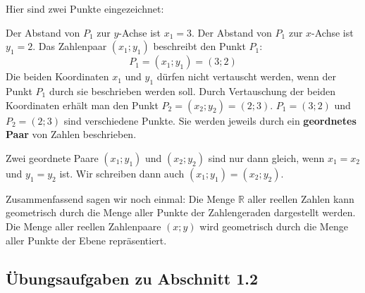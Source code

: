 Hier sind zwei Punkte eingezeichnet:

\begin{center}
\end{center}

Der Abstand von $P_1$ zur $y$-Achse ist $x_1 = 3$. Der Abstand von $P_1$ zur $x$-Achse ist $y_1 = 2$. Das Zahlenpaar $(x_1;y_1)$ beschreibt den Punkt $P_1$:
\[ P_1 = (x_1;y_1) = (3;2) \]
Die beiden Koordinaten $x_1$ und $y_1$ dürfen nicht vertauscht werden, wenn der Punkt $P_1$ durch sie beschrieben werden soll. Durch Vertauschung der beiden Koordinaten erhält man den Punkt $P_2 = (x_2;y_2) = (2;3)$. $P_1 = (3;2)$ und $P_2 = (2;3)$ sind verschiedene Punkte. Sie werden jeweils durch ein \textbf{geordnetes Paar} von Zahlen beschrieben.

Zwei geordnete Paare $(x_1;y_1)$ und $(x_2;y_2)$ sind nur dann gleich, wenn $x_1 = x_2$ und $y_1 = y_2$ ist. Wir schreiben dann auch $(x_1;y_1) = (x_2;y_2)$.

Zusammenfassend sagen wir noch einmal: Die Menge $\mathbb{R}$ aller reellen Zahlen kann geometrisch durch die Menge aller Punkte der Zahlengeraden dargestellt werden. Die Menge aller reellen Zahlenpaare $(x;y)$ wird geometrisch durch die Menge aller Punkte der Ebene repräsentiert.

\subsection{Übungsaufgaben zu Abschnitt 1.2}

